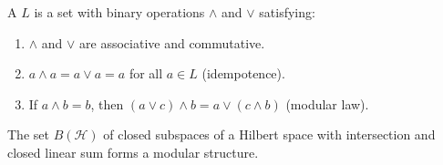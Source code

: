 A  $L$ is a set with binary operations $\wedge$ and $\vee$ satisfying:
\begin{enumerate}
\item[(a)] $\wedge$ and $\vee$ are associative and commutative.
\item[(b)] $a \wedge a = a \vee a = a$ for all $a \in L$ (idempotence).
\item[(c)] If $a \wedge b = b$, then $(a \vee c) \wedge b = a \vee (c \wedge b)$ (modular law).
\end{enumerate}
The set $B(\mathcal{H})$ of closed subspaces of a Hilbert space with intersection and closed linear sum forms a modular structure.
